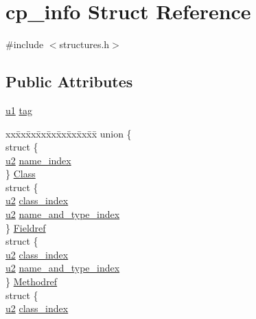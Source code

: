 \hypertarget{structcp__info}{}\section{cp\+\_\+info Struct Reference}
\label{structcp__info}


{\ttfamily \#include $<$structures.\+h$>$}

\subsection*{Public Attributes}
\begin{DoxyCompactItemize}
\item 
\hyperlink{structures_8h_a64f8055b64cf2a4c299c841130c5c938}{u1} \hyperlink{structcp__info_a045b8801a6e96a2a31d3b62ea684f141}{tag}
\item 
\begin{tabbing}
xx\=xx\=xx\=xx\=xx\=xx\=xx\=xx\=xx\=\kill
union \{\\
\>struct \{\\
\>\>\hyperlink{structures_8h_a55ef8d87fd202b8417704c089899c5b9}{u2} \hyperlink{structcp__info_a0b2c4677d0d56defd858fdc796caec87}{name\_index}\\
\>\} \hyperlink{structcp__info_a322117cc9b35710232212d96443b9c46}{Class}\\
\>struct \{\\
\>\>\hyperlink{structures_8h_a55ef8d87fd202b8417704c089899c5b9}{u2} \hyperlink{structcp__info_a1c7c3f3e2f9a620669b5f5cc51249ef8}{class\_index}\\
\>\>\hyperlink{structures_8h_a55ef8d87fd202b8417704c089899c5b9}{u2} \hyperlink{structcp__info_a1b947f3ff3eee58acf5500debf45848c}{name\_and\_type\_index}\\
\>\} \hyperlink{structcp__info_aee4742a1bbb698a449a95a88dfc6b4f9}{Fieldref}\\
\>struct \{\\
\>\>\hyperlink{structures_8h_a55ef8d87fd202b8417704c089899c5b9}{u2} \hyperlink{structcp__info_a1c7c3f3e2f9a620669b5f5cc51249ef8}{class\_index}\\
\>\>\hyperlink{structures_8h_a55ef8d87fd202b8417704c089899c5b9}{u2} \hyperlink{structcp__info_a1b947f3ff3eee58acf5500debf45848c}{name\_and\_type\_index}\\
\>\} \hyperlink{structcp__info_ae02638b6c90e9d24eae9c8bfc4b09f1c}{Methodref}\\
\>struct \{\\
\>\>\hyperlink{structures_8h_a55ef8d87fd202b8417704c089899c5b9}{u2} \hyperlink{structcp__info_a1c7c3f3e2f9a620669b5f5cc51249ef8}{class\_index}\\

\end{tabbing}
\end{DoxyCompactItemize}
